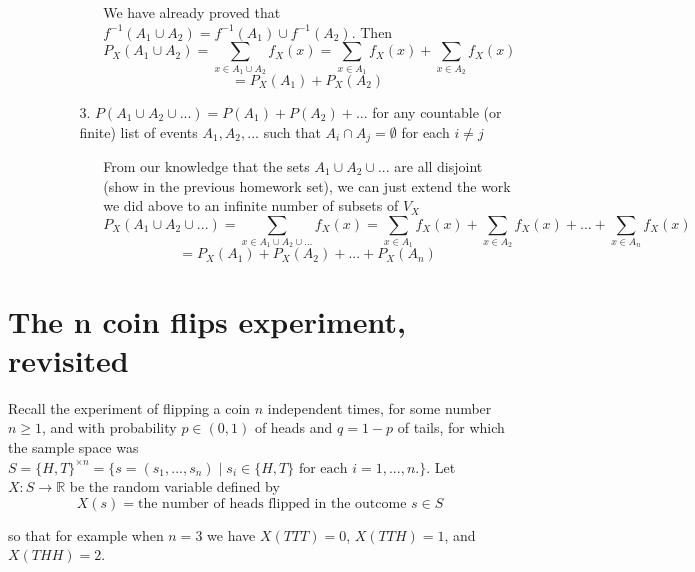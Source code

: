 \documentclass[hidelinks]{article}
\begin{document}
\begin{itemize}
\begin{itemize}
\begin{itemize}
           \begin{itemize}
               \item[ ] We have already proved that $f^{-1}(A_1 \cup A_2) = f^{-1}(A_1) \cup f^{-1}(A_2)$. Then 
                \[
                    P_X(A_1 \cup A_2) =  \sum_{x \in A_1 \cup A_2} f_X(x) =  \sum_{x \in A_1} f_X(x) +  \sum_{x \in A_2} f_X(x)
                \]
                \[
                    = P_X(A_1) + P_X(A_2)
                \]
            \end{itemize}
            \item[3.] $P(A_1 \cup A_2 \cup ...) = P(A_1) + P(A_2) + ...$ for any countable (or finite) list of events $A_1, A_2, ...$ such that $A_i \cap A_j= \emptyset$ for each $i \neq j$
            \begin{itemize}
                \item[ ] From our knowledge that the sets $A_1 \cup A_2 \cup ...$ are all disjoint (show in the previous homework set), we can just extend the work we did above to an infinite number of subsets of $V_X$
                \[
                    P_X(A_1 \cup A_2 \cup ... ) =  \sum_{x \in A_1 \cup A_2 \cup ... } f_X(x) =  \sum_{x \in A_1} f_X(x) +  \sum_{x \in A_2} f_X(x) + ... + \sum_{x \in A_n} f_X(x) 
                \]
                \[
                    = P_X(A_1) + P_X(A_2) + ... +P_X(A_n)
                \]
            \end{itemize}
        \end{itemize}
    \end{itemize}
\end{itemize}
\newpage
\section{The n coin flips experiment, revisited}
Recall the experiment of flipping a coin $n$ independent times, for some number $n \geq 1$, and with probability $p \in (0,1)$ of heads and $q = 1 - p$ of tails, for which the sample space was $S = \{H, T\}^{ \times n } = \{s = (s_1, ..., s_n) \mid s_i \in \{H, T\} \text{ for each } i = 1, ..., n. \}$.
Let $X : S \rightarrow \mathbb{R}$ be the random variable defined by
$$X(s) = \text{the number of heads flipped in the outcome } s \in S$$

so that for example when $n = 3$ we have $X(TTT) = 0$, $X(TTH) = 1$, and $X(THH) = 2$.
\end{document}
